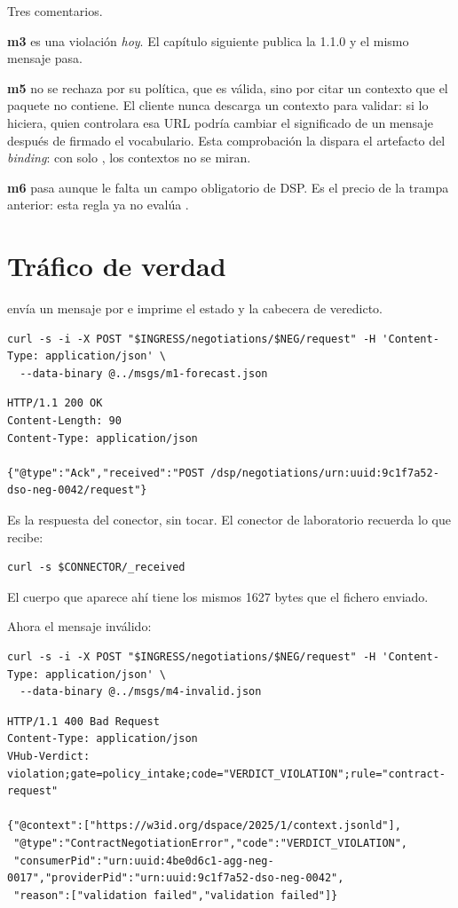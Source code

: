 \medskip
Tres comentarios.

\textbf{m3} es una violación \emph{hoy}. El capítulo siguiente publica la 1.1.0 y el mismo mensaje pasa.

\textbf{m5} no se rechaza por su política, que es válida, sino por citar un contexto que el paquete no contiene.
El cliente nunca descarga un contexto para validar: si lo hiciera, quien controlara esa URL podría cambiar el
significado de un mensaje después de firmado el vocabulario. Esta comprobación la dispara el artefacto
 del \emph{binding}: con solo , los contextos no se miran.

\textbf{m6} pasa aunque le falta un campo obligatorio de DSP. Es el precio de la trampa anterior: esta regla ya
no evalúa .

\section{Tráfico de verdad}

 envía un mensaje por  e imprime el estado y la cabecera de veredicto.

\begin{lstlisting}[style=sh]
curl -s -i -X POST "$INGRESS/negotiations/$NEG/request" -H 'Content-Type: application/json' \
  --data-binary @../msgs/m1-forecast.json
\end{lstlisting}
\begin{lstlisting}[style=out]
HTTP/1.1 200 OK
Content-Length: 90
Content-Type: application/json

{"@type":"Ack","received":"POST /dsp/negotiations/urn:uuid:9c1f7a52-dso-neg-0042/request"}
\end{lstlisting}

Es la respuesta del conector, sin tocar. El conector de laboratorio recuerda lo que recibe:

\begin{lstlisting}[style=sh]
curl -s $CONNECTOR/_received
\end{lstlisting}

El cuerpo que aparece ahí tiene los mismos 1627 bytes que el fichero enviado.

Ahora el mensaje inválido:

\begin{lstlisting}[style=sh]
curl -s -i -X POST "$INGRESS/negotiations/$NEG/request" -H 'Content-Type: application/json' \
  --data-binary @../msgs/m4-invalid.json
\end{lstlisting}
\begin{lstlisting}[style=out]
HTTP/1.1 400 Bad Request
Content-Type: application/json
VHub-Verdict: violation;gate=policy_intake;code="VERDICT_VIOLATION";rule="contract-request"

{"@context":["https://w3id.org/dspace/2025/1/context.jsonld"],
 "@type":"ContractNegotiationError","code":"VERDICT_VIOLATION",
 "consumerPid":"urn:uuid:4be0d6c1-agg-neg-0017","providerPid":"urn:uuid:9c1f7a52-dso-neg-0042",
 "reason":["validation failed","validation failed"]}
\end{lstlisting}

